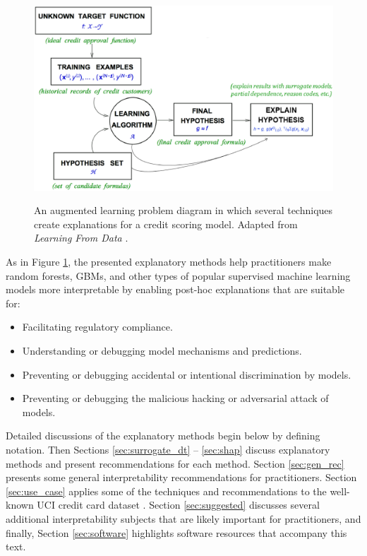 \documentclass[11pt]{asaproc}
\begin{document}
\begin{figure}[htb]
	\begin{center}
		\includegraphics[scale=0.33]{img/figure_1.eps}
		\label{fig:learning_problem}
		\caption{An augmented learning problem diagram in which several techniques create explanations for a credit scoring model. Adapted from \textit{Learning From Data} \cite{lfd}.}
	\end{center}
\end{figure}	
	
As in Figure \ref{fig:learning_problem}, the presented explanatory methods help practitioners make random forests, GBMs, and other types of popular supervised  machine learning models more interpretable by enabling post-hoc explanations that are suitable for:\\

\begin{itemize}
	\item Facilitating regulatory compliance.
	\item Understanding or debugging model mechanisms and predictions.
	\item Preventing or debugging accidental or intentional discrimination by models.
	\item Preventing or debugging the malicious hacking or adversarial attack of models.
\end{itemize}

Detailed discussions of the explanatory methods begin below by defining notation. Then Sections \ref{sec:surrogate_dt} -- \ref{sec:shap} discuss explanatory methods and present recommendations for each method. Section \ref{sec:gen_rec} presents some general interpretability recommendations for practitioners. Section \ref{sec:use_case} applies some of the techniques and recommendations to the well-known UCI credit card dataset \cite{uci}. Section \ref{sec:suggested} discusses several additional interpretability subjects that are likely important for practitioners, and finally, Section \ref{sec:software} highlights software resources that accompany this text. 
\end{document}
